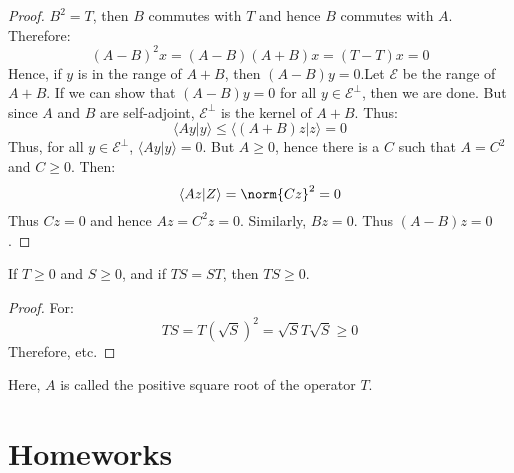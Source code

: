 \documentclass[crop=false,class=book,oneside]{standalone}                      %
\begin{document}
\begin{proof}
            $B^{2}=T$, then $B$ commutes with $T$ and hence
            $B$ commutes with $A$. Therefore:
            \begin{equation}
                (A-B)^{2}x=(A-B)(A+B)x=(T-T)x=0
            \end{equation}
            Hence, if $y$ is in the range of $A+B$, then
            $(A-B)y=0$.Let $\mathcal{E}$ be the range of $A+B$.
            If we can show that $(A-B)y=0$ for all
            $y\in\mathcal{E}^{\perp}$, then we are done. But since
            $A$ and $B$ are self-adjoint, $\mathcal{E}^{\perp}$
            is the kernel of $A+B$. Thus:
            \begin{equation}
                \langle{Ay|y}\rangle\leq
                \langle{(A+B)z|z}\rangle=0
            \end{equation}
            Thus, for all $y\in\mathcal{E}^{\perp}$,
            $\langle{Ay|y}\rangle=0$. But $A\geq{0}$, hence there
            is a $C$ such that $A=C^{2}$ and $C\geq{0}$.
            Then:
            \begin{equation}
                \langle{Az|Z}\rangle=\norm{Cz}^{2}=0
            \end{equation}
            Thus $Cz=0$ and hence $Az=C^{2}z=0$. Similarly,
            $Bz=0$. Thus $(A-B)z=0$.
        \end{proof}
        \begin{theorem}
            If $T\geq{0}$ and $S\geq{0}$, and if
            $TS=ST$, then $TS\geq{0}$.
        \end{theorem}
        \begin{proof}
            For:
            \begin{equation}
                TS=T(\sqrt{S})^{2}=\sqrt{S}T\sqrt{S}\geq{0}
            \end{equation}
            Therefore, etc.
        \end{proof}
        Here, $A$ is called the positive square root of the
        operator $T$.
    \clearpage
    \printglossary[style=longpara]
    \chapter{Homeworks}
\end{document}
